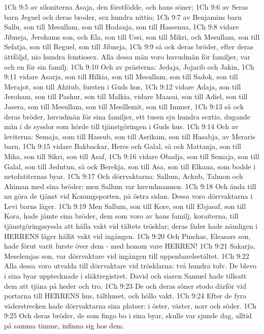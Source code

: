 1Ch 9:5  av siloniterna Asaja, den förstfödde, och hans söner;
1Ch 9:6  av Seras barn Jeguel och deras broder, sex hundra nittio;
1Ch 9:7  av Benjamins barn Sallu, son till Mesullam, son till Hodauja, son till Hassenua,
1Ch 9:8  vidare Jibneja, Jerohams son, och Ela, son till Ussi, son till Mikri, och Mesullam, son till Sefatja, son till Reguel, son till Jibneja,
1Ch 9:9  så ock deras bröder, efter deras ättföljd, nio hundra femtiosex. Alla dessa män voro huvudmän för familjer, var och en för sin familj.
1Ch 9:10  Och av prästerna: Jedaja, Jojarib och Jakin,
1Ch 9:11  vidare Asarja, son till Hilkia, son till Mesullam, son till Sadok, son till Merajot, son till Ahitub, fursten i Guds hus,
1Ch 9:12  vidare Adaja, son till Jeroham, son till Pashur, son till Malkia, vidare Maasai, son till Adiel, son till Jasera, son till Mesullam, son till Mesillemit, son till Immer,
1Ch 9:13  så ock deras bröder, huvudmän för sina familjer, ett tusen sju hundra sextio, dugande män i de sysslor som hörde till tjänstgöringen i Guds hus.
1Ch 9:14  Och av leviterna: Semaja, som till Hassub, son till Asrikam, son till Hasabja, av Meraris barn,
1Ch 9:15  vidare Bakbackar, Heres och Galal, så ock Mattanja, son till Mika, son till Sikri, son till Asaf,
1Ch 9:16  vidare Obadja, son till Semaja, son till Galal, son till Jedutun, så ock Berekja, son till Asa, son till Elkana, som bodde i netofatiternas byar.
1Ch 9:17  Och dörrvaktarna: Sallum, Ackub, Talmon och Ahiman med sina bröder; men Sallum var huvudmannen.
1Ch 9:18  Och ända till nu göra de tjänst vid Konungsporten, på östra sidan. Dessa voro dörrvaktarna i Levi barns läger.
1Ch 9:19  Men Sallum, son till Kore, son till Ebjasaf, son till Kora, hade jämte sina bröder, dem som voro av hans familj, koraiterna, till tjänstgöringssyssla att hålla vakt vid tältets trösklar; deras fäder hade nämligen i HERRENS läger hållit vakt vid ingången.
1Ch 9:20  Och Pinehas, Eleasars son, hade förut varit furste över dem - med honom vare HERREN!
1Ch 9:21  Sakarja, Meselemjas son, var dörrvaktare vid ingången till uppenbarelsetältet.
1Ch 9:22  Alla dessa voro utvalda till dörrvaktare vid trösklarna: två hundra tolv. De blevo i sina byar upptecknade i släktregistret. David och siaren Samuel hade tillsatt dem att tjäna på heder och tro.
1Ch 9:23  De och deras söner stodo därför vid portarna till HERRENS hus, tälthuset, och höllo vakt.
1Ch 9:24  Efter de fyra väderstrecken hade dörrvaktarna sina platser: i öster, väster, norr och söder.
1Ch 9:25  Och deras bröder, de som fingo bo i sina byar, skulle var sjunde dag, alltid på samma timme, infinna sig hos dem.
